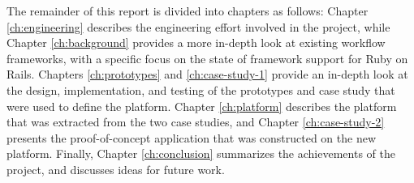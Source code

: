 \documentclass[document.tex]{subfiles}
\begin{document}
The remainder of this report is divided into chapters as follows: Chapter \ref{ch:engineering} describes the engineering effort involved in the project, while Chapter \ref{ch:background} provides a more in-depth look at existing workflow frameworks, with a specific focus on the state of framework support for Ruby on Rails.
Chapters \ref{ch:prototypes} and \ref{ch:case-study-1} provide an in-depth look at the design, implementation, and testing of the prototypes and case study that were used to define the platform.
Chapter \ref{ch:platform} describes the platform that was extracted from the two case studies, and Chapter \ref{ch:case-study-2} presents the proof-of-concept application that was constructed on the new platform.
Finally, Chapter \ref{ch:conclusion} summarizes the achievements of the project, and discusses ideas for future work.
\end{document}
